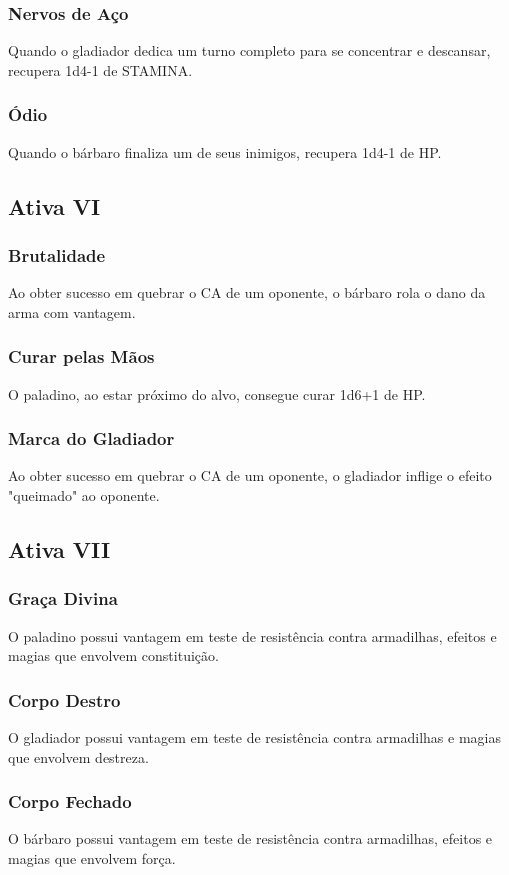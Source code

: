 \documentclass[10pt,twoside,twocolumn]{book}
\begin{document}
\subsubsection*{Nervos de Aço}
Quando o gladiador dedica um turno completo para se concentrar e descansar, recupera 1d4-1 de STAMINA.
\subsubsection*{Ódio}
Quando o bárbaro finaliza um de seus inimigos, recupera 1d4-1 de HP.

\subsection*{Ativa VI}
\subsubsection*{Brutalidade}
Ao obter sucesso em quebrar o CA de um oponente, o bárbaro rola o dano da arma com vantagem.
\subsubsection*{Curar pelas Mãos}
O paladino, ao estar próximo do alvo, consegue curar 1d6+1 de HP.
\subsubsection*{Marca do Gladiador}
Ao obter sucesso em quebrar o CA de um oponente, o gladiador inflige o efeito "queimado" ao oponente.

\subsection*{Ativa VII}
\subsubsection*{Graça Divina}
O paladino possui vantagem em teste de resistência contra armadilhas, efeitos e magias que envolvem constituição.
\subsubsection*{Corpo Destro}
O gladiador possui vantagem em teste de resistência contra armadilhas e magias que envolvem destreza.
\subsubsection*{Corpo Fechado}
O bárbaro possui vantagem em teste de resistência contra armadilhas, efeitos e magias que envolvem força.
\end{document}
